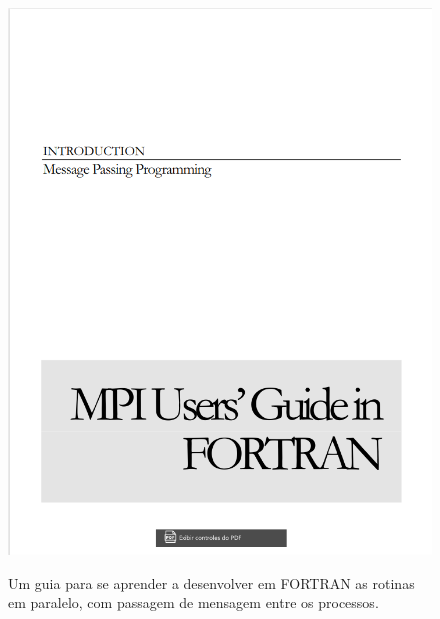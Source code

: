 \documentclass[xcolor=dvipsnames,10pt,aspectratio=169]{beamer}
\begin{document}
\begin{frame}
\begin{minipage}[h!]{0.33\textwidth}
\begin{figure}
				\includegraphics[page = 1,trim={0.0cm 0.0cm 0.0cm 0.0cm},clip=true, scale = 0.165]{Referencias/MPI_Guide_FORTRAN.png}\\	
				\caption{Um guia para se aprender a desenvolver em FORTRAN as rotinas em paralelo, com passagem de mensagem entre os processos.}
			\end{figure}
			\vspace{6cm}
		\end{minipage}
		\begin{minipage}[h!]{0.325\textwidth}
			\begin{figure}
				\centering

\end{figure}
\end{minipage}
\end{frame}
\end{document}
